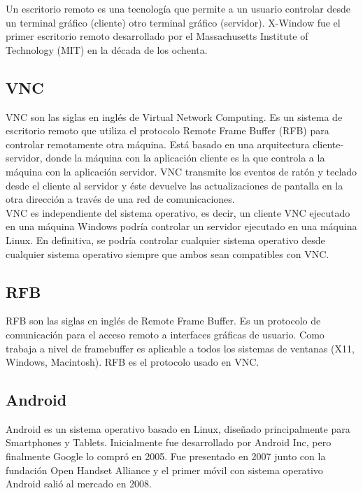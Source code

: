 Un escritorio remoto es una tecnología que permite a un usuario controlar desde un terminal gráfico (cliente) otro terminal gráfico (servidor). X-Window fue el primer escritorio remoto desarrollado por el Massachusetts Institute of Technology (MIT) en la década de los ochenta.\\

\subsection{VNC}

VNC son las siglas en inglés de Virtual Network Computing. Es un sistema de escritorio remoto que utiliza el protocolo Remote Frame Buffer (RFB) para controlar remotamente otra máquina. Está basado en una arquitectura cliente-servidor, donde la máquina con la aplicación cliente es la que controla a la máquina con la aplicación servidor. VNC transmite los eventos de ratón y teclado desde el cliente al servidor y éste devuelve las actualizaciones de pantalla en la otra dirección a través de una red de comunicaciones.\\

VNC es independiente del sistema operativo, es decir, un cliente VNC ejecutado en una máquina Windows podría controlar un servidor ejecutado en una máquina Linux. En definitiva, se podría controlar cualquier sistema operativo desde cualquier sistema operativo siempre que ambos sean compatibles con VNC.\\

\subsection{RFB}

RFB son las siglas en inglés de Remote Frame Buffer. Es un protocolo de comunicación para el acceso remoto a interfaces gráficas de usuario. Como trabaja a nivel de framebuffer es aplicable a todos los sistemas de ventanas (X11, Windows, Macintosh). RFB es el protocolo usado en VNC.\\

\subsection{Android}

Android es un sistema operativo basado en Linux, diseñado principalmente para Smartphones y Tablets. Inicialmente fue desarrollado por Android Inc, pero finalmente Google lo compró en 2005. Fue presentado en 2007 junto con la fundación Open Handset Alliance y el primer móvil con sistema operativo Android salió al mercado en 2008.\\

